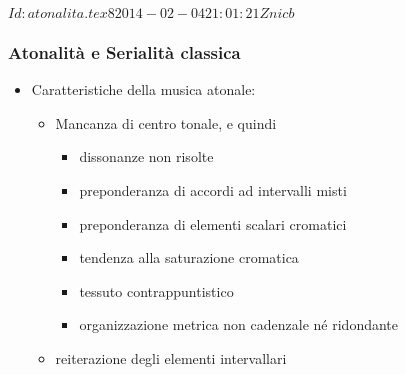 %
%
\svnInfo $Id: atonalita.tex 8 2014-02-04 21:01:21Z nicb $

\setcounter{ms}{0}
\begin{frame}
    \frametitle{Atonalit\`a e Serialit\`a classica}

    \begin{itemize}

        \item Caratteristiche della musica atonale:

        \begin{itemize}

            \item Mancanza di centro tonale, e quindi

            \begin{itemize}

                \item dissonanze non risolte

                \item preponderanza di accordi ad intervalli misti

                \item preponderanza di elementi scalari cromatici

                \item tendenza alla saturazione cromatica

                \item tessuto contrappuntistico

                \item organizzazione metrica non cadenzale n\'e ridondante

            \end{itemize}

            \item reiterazione degli elementi intervallari

        \end{itemize}

    \end{itemize}

\end{frame}

